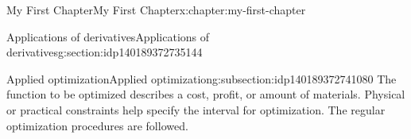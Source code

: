 \documentclass[oneside,10pt,]{book}
\begin{document}
\begin{chapterptx}{My First Chapter}{}{My First Chapter}{}{}{x:chapter:my-first-chapter}
\begin{sectionptx}{Applications of derivatives}{}{Applications of derivatives}{}{}{g:section:idp140189372735144}
\begin{subsectionptx}{Applied optimization}{}{Applied optimization}{}{}{g:subsection:idp140189372741080}
The function to be optimized describes a cost, profit, or amount of materials. Physical or practical constraints help specify the interval for optimization.  The regular optimization procedures are followed.%
\end{subsectionptx}
\end{sectionptx}
\end{chapterptx}
\end{document}
